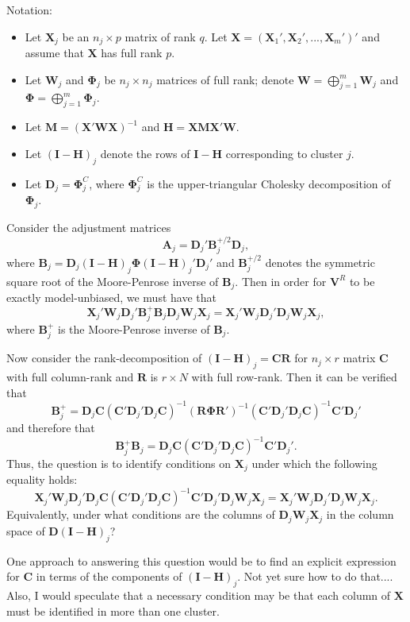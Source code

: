 \documentclass{article}\usepackage[]{graphicx}\usepackage[]{color}
\newcommand{\bm}{\mathbf}
\newcommand{\bs}{\boldsymbol}
\begin{document}
\def\spacingset#1{\renewcommand{\baselinestretch}%
{#1}\small\normalsize} \spacingset{1}

Notation:
\begin{itemize}
\item Let $\bm{X}_j$ be an $n_j \times p$ matrix of rank $q$. Let $\bm{X} = \left(\bm{X}_1', \bm{X}_2',...,\bm{X}_m'\right)'$ and assume that $\bm{X}$ has full rank $p$.
\item Let $\bm{W}_j$ and $\bs\Phi_j$ be $n_j \times n_j$ matrices of full rank; denote $\bm{W} = \bigoplus_{j=1}^m \bm{W}_j$ and $\bs\Phi = \bigoplus_{j=1}^m \bs\Phi_j$. 
\item Let $\bm{M} = \left(\bm{X}'\bm{W}\bm{X}\right)^{-1}$ and $\bm{H} = \bm{X}\bm{M}\bm{X}'\bm{W}$. 
\item Let $\left(\bm{I} - \bm{H}\right)_j$ denote the rows of $\bm{I} - \bm{H}$ corresponding to cluster $j$. 
\item Let $\bm{D}_j = \bs\Phi_j^C$, where $\bs\Phi_j^C$ is the upper-triangular Cholesky decomposition of $\bs\Phi_j$.
\end{itemize}

Consider the adjustment matrices 
\[
\bm{A}_j = \bm{D}_j' \bm{B}_j^{+/2} \bm{D}_j, \]
where $\bm{B}_j = \bm{D}_j \left(\bm{I} - \bm{H}\right)_j \bs\Phi \left(\bm{I} - \bm{H}\right)_j' \bm{D}_j'$ and $\bm{B}_j^{+/2}$ denotes the symmetric square root of the Moore-Penrose inverse of $\bm{B}_j$. Then in order for $\bm{V}^R$ to be exactly model-unbiased, we must have that 
\begin{equation}
\bm{X}_j' \bm{W}_j \bm{D}_j' \bm{B}_j^+ \bm{B}_j \bm{D}_j \bm{W}_j \bm{X}_j = \bm{X}_j' \bm{W}_j \bm{D}_j' \bm{D}_j \bm{W}_j \bm{X}_j,
\end{equation}
where $\bm{B}_j^+$ is the Moore-Penrose inverse of $\bm{B}_j$.

Now consider the rank-decomposition of $\left(\bm{I} - \bm{H}\right)_j = \bm{C}\bm{R}$ for $n_j \times r$ matrix $\bm{C}$ with full column-rank and $\bm{R}$ is $r \times N$ with full row-rank. Then it can be verified that \[
\bm{B}_j^+ = \bm{D}_j \bm{C}\left(\bm{C}'\bm{D}_j'\bm{D}_j \bm{C}\right)^{-1} \left(\bm{R}\bs\Phi\bm{R}'\right)^{-1} \left(\bm{C}'\bm{D}_j'\bm{D}_j \bm{C}\right)^{-1} \bm{C}' \bm{D}_j'
\]
and therefore that \[
\bm{B}_j^+ \bm{B}_j = \bm{D}_j \bm{C}\left(\bm{C}'\bm{D}_j'\bm{D}_j \bm{C}\right)^{-1} \bm{C}' \bm{D}_j'.
\]
Thus, the question is to identify conditions on $\bm{X}_j$ under which the following equality holds: \[
\bm{X}_j' \bm{W}_j \bm{D}_j' \bm{D}_j \bm{C}\left(\bm{C}'\bm{D}_j'\bm{D}_j \bm{C}\right)^{-1} \bm{C}' \bm{D}_j' \bm{D}_j \bm{W}_j \bm{X}_j = \bm{X}_j' \bm{W}_j \bm{D}_j' \bm{D}_j \bm{W}_j \bm{X}_j. \]
Equivalently, under what conditions are the columns of $\bm{D}_j \bm{W}_j\bm{X}_j$ in the column space of $\bm{D}\left(\bm{I} - \bm{H}\right)_j$?

One approach to answering this question would be to find an explicit expression for $\bm{C}$ in terms of the components of $\left(\bm{I} - \bm{H}\right)_j$. Not yet sure how to do that.... Also, I would speculate that a necessary condition may be that each column of $\bm{X}$ must be identified in more than one cluster. 
\end{document}
